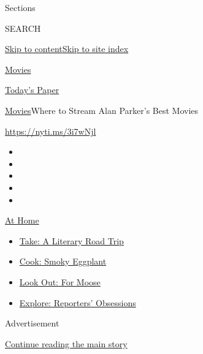 Sections

SEARCH

\protect\hyperlink{site-content}{Skip to
content}\protect\hyperlink{site-index}{Skip to site index}

\href{https://www.nytimes.com/section/movies}{Movies}

\href{https://myaccount.nytimes.com/auth/login?response_type=cookie\&client_id=vi}{}

\href{https://www.nytimes.com/section/todayspaper}{Today's Paper}

\href{/section/movies}{Movies}\textbar{}Where to Stream Alan Parker's
Best Movies

\url{https://nyti.ms/3i7wNjl}

\begin{itemize}
\item
\item
\item
\item
\item
\end{itemize}

\href{https://www.nytimes.com/spotlight/at-home?action=click\&pgtype=Article\&state=default\&region=TOP_BANNER\&context=at_home_menu}{At
Home}

\begin{itemize}
\tightlist
\item
  \href{https://www.nytimes.com/2020/07/28/books/time-for-a-literary-road-trip.html?action=click\&pgtype=Article\&state=default\&region=TOP_BANNER\&context=at_home_menu}{Take:
  A Literary Road Trip}
\item
  \href{https://www.nytimes.com/2020/07/29/magazine/bored-with-your-home-cooking-some-smoky-eggplant-will-fix-that.html?action=click\&pgtype=Article\&state=default\&region=TOP_BANNER\&context=at_home_menu}{Cook:
  Smoky Eggplant}
\item
  \href{https://www.nytimes.com/2020/07/27/travel/moose-michigan-isle-royale.html?action=click\&pgtype=Article\&state=default\&region=TOP_BANNER\&context=at_home_menu}{Look
  Out: For Moose}
\item
  \href{https://www.nytimes.com/interactive/2020/at-home/even-more-reporters-editors-diaries-lists-recommendations.html?action=click\&pgtype=Article\&state=default\&region=TOP_BANNER\&context=at_home_menu}{Explore:
  Reporters' Obsessions}
\end{itemize}

Advertisement

\protect\hyperlink{after-top}{Continue reading the main story}

